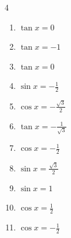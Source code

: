\begin{multicols}{4}
\begin{enumerate}
  \item $\displaystyle \tan{x}  = 0$

        \phantom{$\displaystyle x = 0 , \pi$}

  \item $\displaystyle \tan{x}  = -1$


  \item $\displaystyle \tan{x}  = 0$

        \phantom{$\displaystyle x = 0 , \pi$}

  \item $\displaystyle \sin{x}  = -\frac{1}{2}$


  \item $\displaystyle \cos{x}  = -\frac{\sqrt{3}}{2}$


  \item $\displaystyle \tan{x}  = -\frac{1}{\sqrt{3}}$


  \item $\displaystyle \cos{x}  = -\frac{1}{2}$


  \item $\displaystyle \sin{x}  = \frac{\sqrt{3}}{2}$


  \item $\displaystyle \sin{x}  = 1$


  \item $\displaystyle \cos{x}  = \frac{1}{2}$


  \item $\displaystyle \cos{x}  = -\frac{1}{2}$


\columnbreak %


\end{enumerate}
\end{multicols}
